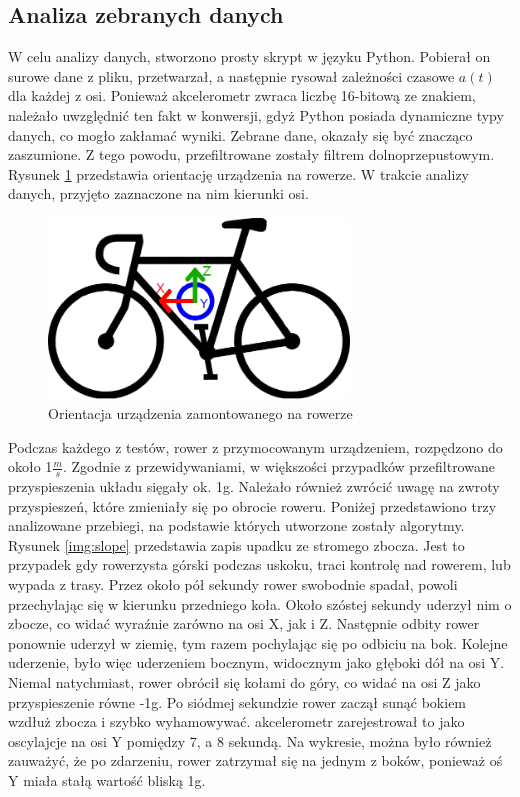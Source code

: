 \subsection{Analiza zebranych danych }
\label{sec:data_analysis}
W celu analizy danych, stworzono prosty skrypt w języku Python. Pobierał on surowe dane z pliku, przetwarzał, a następnie rysował zależności czasowe $a(t)$ dla każdej z osi. Ponieważ akcelerometr zwraca liczbę 16-bitową ze znakiem, należało uwzględnić ten fakt w konwersji, gdyż Python posiada dynamiczne typy danych, co mogło zakłamać wyniki. Zebrane dane, okazały się być znacząco zaszumione. Z tego powodu, przefiltrowane zostały filtrem dolnoprzepustowym. Rysunek \ref{img:bike} przedstawia orientację urządzenia na rowerze. W trakcie analizy danych, przyjęto zaznaczone na nim kierunki osi.
\begin{figure}[hb]
    \centering
    \includegraphics[width=8cm]{Graphics/rowerek.png}
    \caption{Orientacja urządzenia zamontowanego na rowerze}
    \label{img:bike}
\end{figure}
Podczas każdego z testów, rower z przymocowanym urządzeniem, rozpędzono do około 1$\frac{m}{s}$. Zgodnie z przewidywaniami, w większości przypadków przefiltrowane przyspieszenia układu sięgały ok. 1g. Należało również zwrócić uwagę na zwroty przyspieszeń, które zmieniały się po obrocie roweru. Poniżej przedstawiono trzy analizowane przebiegi, na podstawie których utworzone zostały algorytmy. 
\newline
\newline
Rysunek \ref{img:slope} przedstawia zapis upadku ze stromego zbocza. Jest to przypadek gdy rowerzysta górski podczas uskoku, traci kontrolę nad rowerem, lub wypada z trasy. Przez około pół sekundy rower swobodnie spadał, powoli przechylając się w kierunku przedniego koła. Około szóstej sekundy uderzył nim o zbocze, co widać wyraźnie zarówno na osi X, jak i Z. Następnie odbity rower ponownie uderzył w ziemię, tym razem pochylając się po odbiciu na bok. Kolejne uderzenie, było więc uderzeniem bocznym, widocznym jako głęboki dół  na osi Y. Niemal natychmiast, rower obrócił się kołami do góry, co widać na osi Z jako przyspieszenie równe -1g. Po siódmej sekundzie rower zaczął sunąć bokiem wzdłuż zbocza i szybko wyhamowywać. akcelerometr zarejestrował to jako oscylajcje na osi Y pomiędzy 7, a 8 sekundą. Na wykresie, można było również zauważyć, że po zdarzeniu, rower zatrzymał się na jednym z boków, ponieważ oś Y miała stałą wartość bliską 1g.
